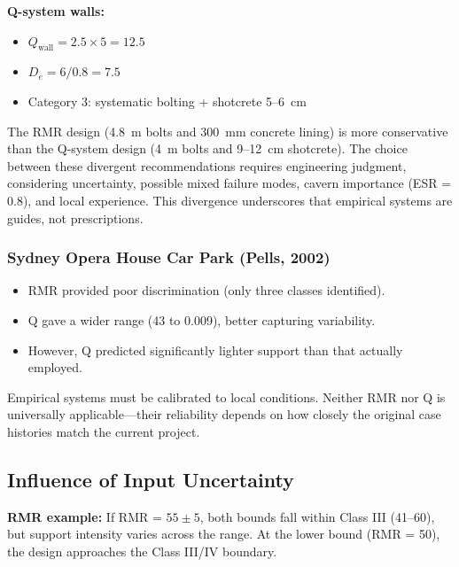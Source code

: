 \documentclass[a4paper,12pt]{article}
\begin{document}
\textbf{Q-system walls:}
\begin{itemize}
    \item $Q_{\text{wall}} = 2.5\times 5 = 12.5$
    \item $D_e = 6/0.8 = 7.5$
    \item Category 3: systematic bolting + shotcrete 5--6~cm
\end{itemize}

\begin{warnbox}
The RMR design (4.8~m bolts and 300~mm concrete lining) is more conservative than the Q-system design (4~m bolts and 9--12~cm shotcrete). The choice between these divergent recommendations requires engineering judgment, considering uncertainty, possible mixed failure modes, cavern importance (ESR = 0.8), and local experience. This divergence underscores that empirical systems are guides, not prescriptions.
\end{warnbox}

\subsubsection{Sydney Opera House Car Park (Pells, 2002)}
\begin{itemize}
    \item RMR provided poor discrimination (only three classes identified).
    \item Q gave a wider range (43 to 0.009), better capturing variability.
    \item However, Q predicted significantly lighter support than that actually employed.
\end{itemize}

\begin{notebox}
Empirical systems must be calibrated to local conditions. Neither RMR nor Q is universally applicable---their reliability depends on how closely the original case histories match the current project.
\end{notebox}

\subsection{Influence of Input Uncertainty}

\textbf{RMR example:} If RMR = $55 \pm 5$, both bounds fall within Class III (41--60), but support intensity varies across the range. At the lower bound (RMR = 50), the design approaches the Class III/IV boundary.
\end{document}
